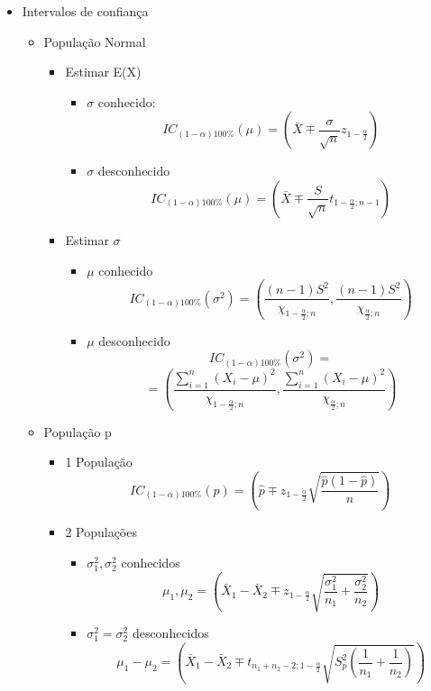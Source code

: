\documentclass{article}
\begin{document}
\begin{multicols*}{2}
\begin{itemize}
    \vfill\null
    \columnbreak

    \item Intervalos de confiança
    \begin{itemize}
        \item População Normal
        \begin{itemize}
            \item Estimar E(X)
            \begin{itemize}
                \item $\sigma$ conhecido:
                $$IC_{(1- \alpha)100\%}(\mu)=(\bar{X}\mp \frac{\sigma}{\sqrt{n}}z_{1-\frac{\alpha}{2}})$$
                \item $\sigma$ desconhecido
                $$IC_{(1- \alpha)100\%}(\mu)=(\bar{X}\mp \frac{S}{\sqrt{n}}t_{1-\frac{\alpha}{2};n-1})$$
            \end{itemize}
            \item Estimar $\sigma$
            \begin{itemize}
                \item $\mu$ conhecido
                $$IC_{(1- \alpha)100\%}(\sigma^2)=(\frac{(n-1)S^2}{\chi_{1-\frac{\alpha}{2};n}},\frac{(n-1)S^2}{\chi_{\frac{\alpha}{2};n}})$$
                \item $\mu$ desconhecido
                $$IC_{(1- \alpha)100\%}(\sigma^2)=$$$$=(\frac{\sum_{i=1}^n(X_i-\mu)^2}{\chi_{1-\frac{\alpha}{2};n}},\frac{\sum_{i=1}^n(X_i-\mu)^2}{\chi_{\frac{\alpha}{2};n}})$$
            \end{itemize}
        \end{itemize}
        \item População p
        \begin{itemize}
            \item 1 População
            $$IC_{(1- \alpha)100\%}(p)=(\hat{p}\mp z_{1-\frac{\alpha}{2}}\sqrt{\frac{\hat{p}(1-\hat{p})}{n}})$$
            \item 2 Populações
            \begin{itemize}
                \item $\sigma_1^2, \sigma_2^2$ conhecidos
                $$\mu_1, \mu_2=(\bar{X}_1-\bar{X}_2\mp z_{1-\frac{\alpha}{2}}\sqrt{\frac{\sigma_1^2}{n_1}+\frac{\sigma_2^2}{n_2}})$$
                \item $\sigma_1^2 = \sigma_2^2$ desconhecidos
                $$\mu_1-\mu_2=(\bar{X}_1-\bar{X}_2\mp t_{n_1+n_2-2;1-\frac{\alpha}{2}}\sqrt{S_p^2(\frac{1}{n_1}+\frac{1}{n_2})})$$
            \end{itemize}
        \end{itemize}
    \end{itemize}
\end{itemize}
\end{multicols*}
\end{document}
